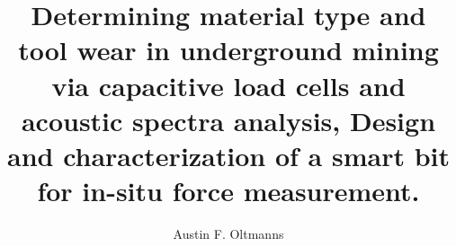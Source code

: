 \documentclass[letterpaper,10pt]{article} %
\title{
    Determining material type and tool wear in underground mining via
    capacitive load cells and acoustic spectra analysis,
    Design and characterization of a smart bit for in-situ force measurement.
    }
\author{Austin F. Oltmanns}        %
\begin{document}

\frontmatter                       %
\maketitle\newpage                 %
\makecopyright{\the\year}\newpage  %
\makesubmittal\newpage             %

\begin{abstract}

\end{abstract} \newpage


\tableofcontents\newpage        %
\listoffigures\newpage          %
\listoftables\newpage           %



\listofabbreviations*                  %
\newpage


\end{document}
